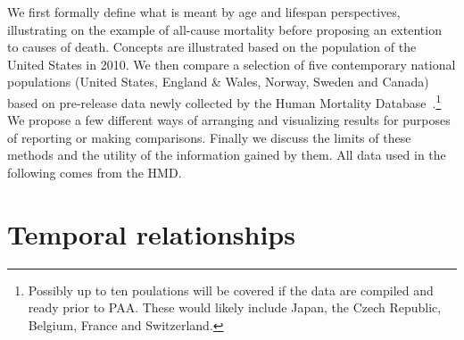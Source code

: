 \documentclass{article}
\begin{document}
We first formally define what is meant by age and lifespan
perspectives, illustrating on the example of all-cause
mortality before proposing an extention to causes of death. Concepts are
illustrated based on the population of the United States in 2010. We then
compare a selection of five contemporary national populations (United States, England \& Wales, Norway, Sweden and Canada) based on pre-release
data newly collected by the Human Mortality
Database~.\footnote{Possibly up to ten poulations will be
covered if the data are compiled and ready prior to PAA. These would likely
include Japan, the Czech Republic, Belgium, France and Switzerland.} We propose
a few different ways of arranging and visualizing results for purposes of reporting or making comparisons. Finally we discuss the limits of these methods and the utility of the information gained by them. All data used in the following comes from the HMD.

\section*{Temporal relationships}

\end{document}
